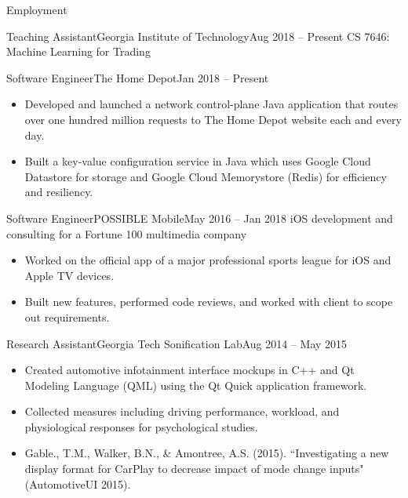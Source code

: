 \documentclass[]{mcdowellcv}
\begin{document}
	\begin{cvsection}{Employment}
		\begin{cvsubsection}{Teaching Assistant}{Georgia Institute of Technology}{Aug 2018 -- Present}
			CS 7646: Machine Learning for Trading
		\end{cvsubsection}

		\begin{cvsubsection}{Software Engineer}{The Home Depot}{Jan 2018 -- Present}
			\begin{itemize}
				\item Developed and launched a network control-plane Java application that routes over one hundred million requests to The Home Depot website each and every day.
				\item Built a key-value configuration service in Java which uses Google Cloud Datastore for storage and Google Cloud Memorystore (Redis) for efficiency and resiliency.
			\end{itemize}
		\end{cvsubsection}
		
		\begin{cvsubsection}{Software Engineer}{POSSIBLE Mobile}{May 2016 -- Jan 2018}	
			iOS development and consulting for a Fortune 100 multimedia company
			\begin{itemize}
				\item Worked on the official app of a major professional sports league for iOS and Apple TV devices.
				\item Built new features, performed code reviews, and worked with client to scope out requirements.
			\end{itemize}
		\end{cvsubsection}
		
		\begin{cvsubsection}{Research Assistant}{Georgia Tech Sonification Lab}{Aug 2014 -- May 2015}		
			\begin{itemize}
				\item Created automotive infotainment interface mockups in C++ and Qt Modeling Language (QML) using the Qt Quick application framework.
				\item Collected measures including driving performance, workload, and physiological responses for psychological studies.
				\item Gable., T.M., Walker, B.N., \& Amontree, A.S. (2015). ``Investigating a new display format for CarPlay to decrease impact of mode change inputs" (AutomotiveUI 2015).
			\end{itemize}
		\end{cvsubsection}
		

\end{cvsection}
\end{document}
